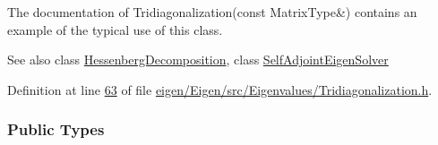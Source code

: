 The documentation of Tridiagonalization(const Matrix\+Type\&) contains an example of the typical use of this class.

\begin{DoxySeeAlso}{See also}
class \hyperlink{group___eigenvalues___module_class_eigen_1_1_hessenberg_decomposition}{Hessenberg\+Decomposition}, class \hyperlink{group___eigenvalues___module_class_eigen_1_1_self_adjoint_eigen_solver}{Self\+Adjoint\+Eigen\+Solver} 
\end{DoxySeeAlso}


Definition at line \hyperlink{eigen_2_eigen_2src_2_eigenvalues_2_tridiagonalization_8h_source_l00063}{63} of file \hyperlink{eigen_2_eigen_2src_2_eigenvalues_2_tridiagonalization_8h_source}{eigen/\+Eigen/src/\+Eigenvalues/\+Tridiagonalization.\+h}.

\subsubsection*{Public Types}
